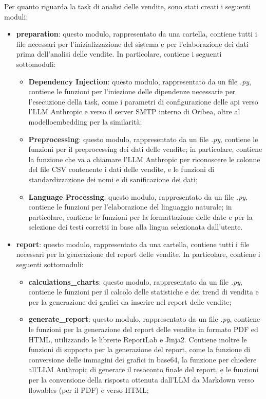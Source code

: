 Per quanto riguarda la task di analisi delle vendite, sono stati creati i seguenti moduli:
\begin{itemize}
    \item \textbf{preparation}: questo modulo, rappresentato da una cartella, contiene tutti i file necessari per l'inizializzazione del sistema e per l'elaborazione dei dati prima dell'analisi delle vendite. In particolare, contiene i seguenti sottomoduli:
    \begin{itemize}
        \item \textbf{Dependency Injection}: questo modulo, rappresentato da un file \emph{.py}, contiene le funzioni per l'iniezione delle dipendenze necessarie per l'esecuzione della task, come i parametri di configurazione delle \gls{api} verso l'LLM Anthropic e verso il server SMTP interno di Oribea, oltre al \gls{modelloembedding} per la similarità;
        \item \textbf{Preprocessing}: questo modulo, rappresentato da un file \emph{.py}, contiene le funzioni per il preprocessing dei dati delle vendite; in particolare, contiene la funzione che va a chiamare l'LLM Anthropic per riconoscere le colonne del file CSV contenente i dati delle vendite, e le funzioni di standardizzazione dei nomi e di sanificazione dei dati;
        \item \textbf{Language Processing}: questo modulo, rappresentato da un file \emph{.py}, contiene le funzioni per l'elaborazione del linguaggio naturale; in particolare, contiene le funzioni per la formattazione delle date e per la selezione dei testi corretti in base alla lingua selezionata dall'utente.
    \end{itemize}
    \item \textbf{report}: questo modulo, rappresentato da una cartella, contiene tutti i file necessari per la generazione del report delle vendite. In particolare, contiene i seguenti sottomoduli:
    \begin{itemize}
        \item \textbf{calculations\_charts}: questo modulo, rappresentato da un file \emph{.py}, contiene le funzioni per il calcolo delle statistiche e dei trend di vendita e per la generazione dei grafici da inserire nel report delle vendite;
        \item \textbf{generate\_report}: questo modulo, rappresentato da un file \emph{.py}, contiene le funzioni per la generazione del report delle vendite in formato PDF ed HTML, utilizzando le librerie ReportLab e Jinja2. Contiene inoltre le funzioni di supporto per la generazione del report, come la funzione di conversione delle immagini dei grafici in base64, la funzione per chiedere all'LLM Anthropic di generare il resoconto finale del report, e le funzioni per la conversione della risposta ottenuta dall'LLM da Markdown verso \gls{flowable}s (per il PDF) e verso HTML;

\end{itemize}
\end{itemize}
